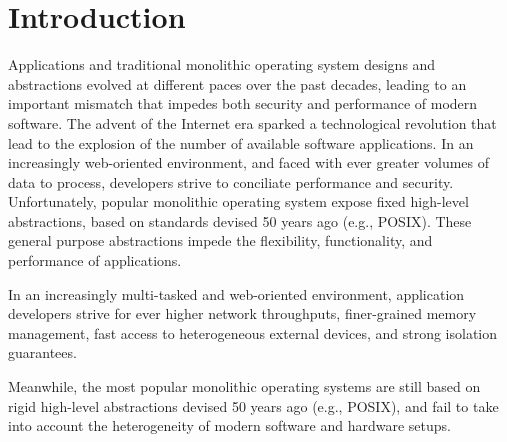 \section{Introduction}

Applications and traditional monolithic operating system designs and abstractions evolved at different paces over the past decades, leading to an important mismatch that impedes both security and performance of modern software.
The advent of the Internet era sparked a technological revolution that lead to the explosion of the number of available software applications.
In an increasingly web-oriented environment, and faced with ever greater volumes of data to process, developers strive to conciliate performance and security.
Unfortunately, popular monolithic operating system expose fixed high-level abstractions, based on standards devised 50 years ago (e.g., POSIX).
These general purpose abstractions impede the flexibility, functionality, and performance of applications.

In an increasingly multi-tasked and web-oriented environment, application developers strive for ever higher network throughputs, finer-grained memory management, fast access to heterogeneous external devices, and strong isolation guarantees.

Meanwhile, the most popular monolithic operating systems are still based on rigid high-level abstractions devised 50 years ago (e.g., POSIX), and fail to take into account the heterogeneity of modern software and hardware setups.
